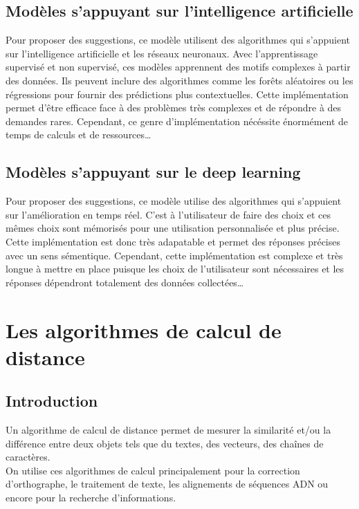 \documentclass[a4paper, 11pt]{report}
\begin{document}
\section{Modèles s'appuyant sur l'intelligence artificielle}
Pour proposer des suggestions, ce modèle utilisent des algorithmes qui s'appuient sur l'intelligence artificielle et les réseaux neuronaux. 
Avec l’apprentissage supervisé et non supervisé, ces modèles apprennent des motifs complexes à partir des données. Ils peuvent inclure des algorithmes comme les forêts aléatoires ou les régressions pour fournir des prédictions plus contextuelles.
Cette implémentation permet d'être efficace face à des problèmes très complexes et de répondre à des demandes rares. Cependant, ce genre d'implémentation nécéssite énormément de temps de calculs et de ressources\dots


\section{Modèles s'appuyant sur le deep learning}
Pour proposer des suggestions, ce modèle utilise des algorithmes qui s'appuient sur l'amélioration en temps réel. C'est à l'utilisateur de faire des choix et ces mêmes choix sont mémorisés pour une utilisation personnalisée et plus précise. Cette implémentation est donc très adapatable et permet des réponses précises avec un sens sémentique. Cependant, cette implémentation est complexe et très longue à mettre en place puisque les choix de l'utilisateur sont nécessaires et les réponses dépendront totalement des données collectées\dots  



\chapter{Les algorithmes de calcul de distance}

\section{Introduction}

Un algorithme de calcul de distance permet de mesurer la similarité et/ou la différence entre deux objets tels que du textes, des vecteurs, des chaînes de caractères. \\
On utilise ces algorithmes de calcul principalement pour la correction d'orthographe, le traitement de texte, les alignements de séquences ADN ou encore pour la recherche d'informations. \\
\end{document}
